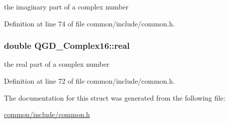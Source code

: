 the imaginary part of a complex number 



Definition at line 74 of file common/include/common.\+h.

\subsubsection[{\texorpdfstring{real}{real}}]{\setlength{\rightskip}{0pt plus 5cm}double Q\+G\+D\+\_\+\+Complex16\+::real}\hypertarget{struct_q_g_d___complex16_aea2798213f363d5b681562b889ff7260}{}\label{struct_q_g_d___complex16_aea2798213f363d5b681562b889ff7260}


the real part of a complex number 



Definition at line 72 of file common/include/common.\+h.



The documentation for this struct was generated from the following file\+:\begin{DoxyCompactItemize}
\item 
\hyperlink{common_2include_2common_8h}{common/include/common.\+h}\end{DoxyCompactItemize}
